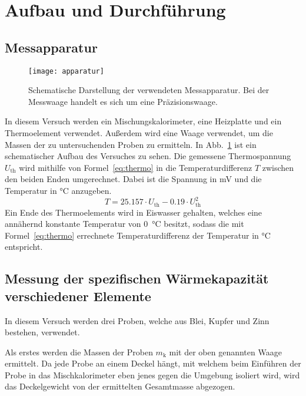 
\section{Aufbau und Durchführung}
%
\subsection{Messapparatur}
%
\begin{figure}[h]
\centering
\texttt{[image: apparatur]}
\caption{Schematische Darstellung der verwendeten Messapparatur.
             Bei der Messwaage handelt es sich um eine Präzisionswaage.}
\label{fig:apparatur}
\end{figure}
%
In diesem Versuch werden ein Mischungskalorimeter, eine Heizplatte und 
ein Thermoelement verwendet. Außerdem wird eine Waage verwendet, um 
die Massen der zu untersuchenden Proben zu ermitteln.
In Abb.~\ref{fig:apparatur} ist ein 
schematischer Aufbau des Versuches zu sehen.
Die gemessene Thermospannung $U_\text{th}$ wird mithilfe von 
Formel~\eqref{eq:thermo} in die Temperaturdifferenz $T$ zwischen den 
beiden Enden umgerechnet. Dabei ist die Spannung in \si{\milli\volt} 
und die Temperatur in \si{\celsius} anzugeben.
%
\begin{equation}
\label{eq:thermo}
T = \num{25.157}\cdot U_\text{th} - \num{0.19}\cdot U_\text{th}^2
\end{equation}
%
Ein Ende des Thermoelements wird in Eiswasser gehalten, welches eine 
annähernd konstante Temperatur von \SI{0}{\celsius} besitzt, sodass die 
mit Formel~\eqref{eq:thermo} errechnete Temperaturdifferenz der Temperatur 
in \si{\celsius} entspricht.
%
\subsection{Messung der spezifischen Wärmekapazität verschiedener Elemente}
In diesem Versuch werden drei Proben, welche aus Blei, Kupfer und Zinn 
bestehen, verwendet.

Als erstes werden die Massen der Proben $m_\text{k}$ mit der oben 
genannten Waage ermittelt. 
Da jede Probe an einem Deckel hängt, mit welchem beim 
Einführen der Probe in das Mischkalorimeter eben jenes gegen die 
Umgebung isoliert wird, wird das Deckelgewicht von der ermittelten 
Gesamtmasse abgezogen.

